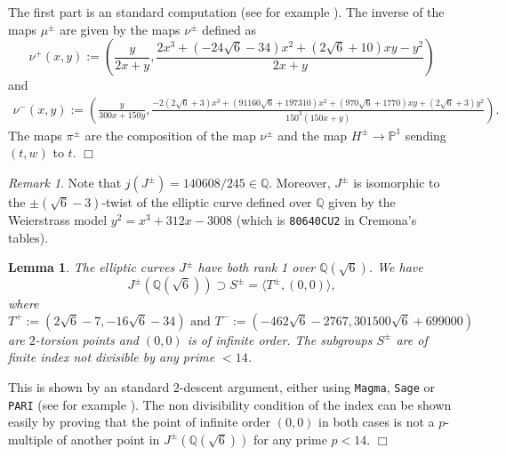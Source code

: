 \documentclass[a4paper,12pt]{amsart}
\newtheorem{lem}[thm]{Lemma}
\theoremstyle{remark}
\newtheorem{rem}[thm]{Remark}
\theoremstyle{definition}
\newenvironment{pf}{\par\noindent{\bf Proof.}\enspace\ignorespaces}{{\hfill $\Box$}\par\par}
\begin{document}
\begin{pf} The first part is an standard computation (see for example \cite[\S 7.2.3]{Coh}
). The inverse of the maps $\mu^{\pm}$ are given by the
maps $\nu^{\pm}$ defined as
$$
\nu^+(x,y):=\left( \frac y{2x + y},
\frac{2x^3 + (-24\sqrt{6}-34)x^2+(2\sqrt{6}+ 10)xy-y^2}{2x+ y}
\right)
$$
and
$$
\begin{array}{l}
\nu^-(x,y):=\left( \frac{y}{300x + 150y},\frac{
-2(2\sqrt{6}+3)x^3+(91160\sqrt{6}+197310)x^2+(970\sqrt{6}+1770)xy+(2\sqrt{6}+3)y^2
}{150^3(150x+ y)} \right)\!.
\end{array}
$$
The maps $\pi^{\pm}$ are the composition of the map
$\nu^{\pm}$ and the map $H^{\pm}\to {{\mathbb{P}}}^1$ sending $(t,w)$ to $t$.
\end{pf}

\begin{rem}
Note that $j(J^{\pm})=140608/245\in{{\mathbb{Q}}}$. Moreover,  $J^{\pm}$ is
isomorphic to the  $\pm(\sqrt{6}-3)$-twist of the elliptic curve
defined over ${{\mathbb{Q}}}$ given by the Weierstrass model
$y^2=x^3+312x-3008$ (which is \verb+80640CU2+ in Cremona's
tables).
\end{rem}

\begin{lem}\label{rankJ}
The elliptic curves $J^{\pm}$ have both rank 1 over ${{\mathbb{Q}}}(\sqrt{6})$.
We have
$$
J^{\pm}({{\mathbb{Q}}}(\sqrt{6}))\supset S^{\pm}= \langle T ^{\pm} ,(0,0)\rangle,
$$
where $$T^+:=(2\sqrt{6} - 7 , -16\sqrt{6} - 34) \mbox{ and }
T^-:=(-462\sqrt{6} - 2767 , 301500\sqrt{6} + 699000 )$$ are
$2$-torsion points and $(0,0)$ is of infinite order. The subgroups
$S^{\pm}$ are of finite index not divisible by any prime $<14$.
\end{lem}

\begin{pf} This is shown by an standard $2$-descent argument,
either using \verb+Magma+, \verb+Sage+ or \verb+PARI+ (see for
example \cite[\S 8.3]{Coh}). The non divisibility condition of the
index can be shown easily by proving that the point of infinite
order $(0,0)$ in both cases is not a $p$-multiple of another point
in $J^{\pm}({{\mathbb{Q}}}(\sqrt{6}))$ for any prime $p<14$.
\end{pf}

\
\end{document}

